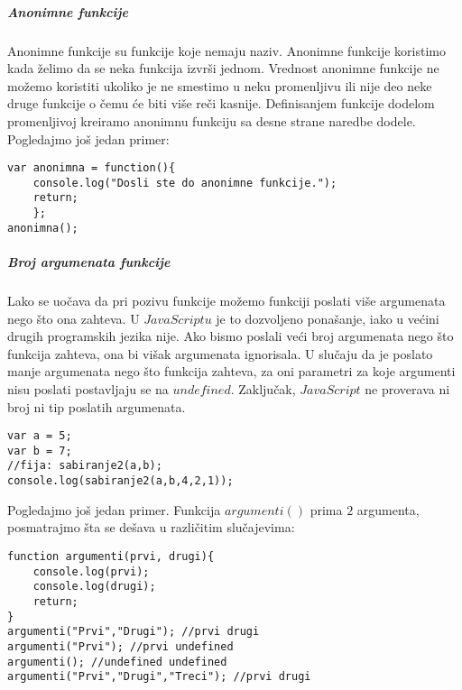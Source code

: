 \subparagraph{Anonimne funkcije}
Anonimne funkcije su funkcije koje nemaju naziv. Anonimne funkcije koristimo kada želimo da se neka funkcija izvrši jednom. Vrednost anonimne funkcije ne možemo koristiti ukoliko je ne smestimo u neku promenljivu ili nije deo neke druge funkcije o čemu će biti više reči kasnije. Definisanjem funkcije dodelom promenljivoj kreiramo anonimnu funkciju sa desne strane naredbe dodele. Pogledajmo još jedan primer:
\begin{lstlisting}[backgroundcolor = \color{lightgray}, breaklines=true]
var anonimna = function(){
	console.log("Dosli ste do anonimne funkcije.");
	return;
	};
anonimna();
\end{lstlisting}

\subparagraph{Broj argumenata funkcije}
Lako se uočava da pri pozivu funkcije možemo funkciji poslati više argumenata nego što ona zahteva. U $JavaScriptu$ je to dozvoljeno ponašanje, iako u većini drugih programskih jezika nije. Ako bismo poslali veći broj argumenata nego što funkcija zahteva, ona bi višak argumenata ignorisala. U slučaju da je poslato manje argumenata nego što funkcija zahteva, za oni parametri za koje argumenti nisu poslati postavljaju se na $undefined$. Zaključak, $JavaScript$ ne proverava ni broj ni tip poslatih argumenata.
\begin{lstlisting}[backgroundcolor = \color{lightgray}, breaklines=true]
var a = 5;
var b = 7;
//fija: sabiranje2(a,b);
console.log(sabiranje2(a,b,4,2,1));
\end{lstlisting}
Pogledajmo još jedan primer.  Funkcija $argumenti()$ prima $2$ argumenta, posmatrajmo šta se dešava u različitim slučajevima:
\begin{lstlisting}[backgroundcolor = \color{lightgray}, breaklines=true]
function argumenti(prvi, drugi){
	console.log(prvi);
	console.log(drugi);
    return;
}
argumenti("Prvi","Drugi"); //prvi drugi
argumenti("Prvi"); //prvi undefined
argumenti(); //undefined undefined
argumenti("Prvi","Drugi","Treci"); //prvi drugi	
\end{lstlisting}


